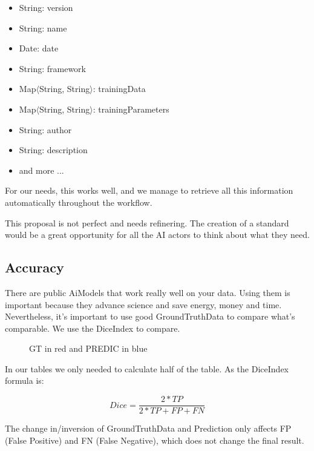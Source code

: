 \begin{itemize}
    \item String: version
    \item String: name
    \item Date: date
    \item String: framework
    \item Map$\langle$String, String$\rangle$: trainingData
    \item Map$\langle$String, String$\rangle$: trainingParameters
    \item String: author
    \item String: description
    \item and more ...
\end{itemize}

For our needs, this works well, and we manage to retrieve all this information
automatically throughout the workflow.

This proposal is not perfect and needs refinering. The creation of a standard
would be a great opportunity for all the \Gls{AI} actors to think about what they
need.

\subsection{Accuracy}

There are public \Gls{AiModel}s that work really well on your data. Using them is
important because they advance science and save energy, money and time.
Nevertheless, it's important to use good \Gls{GroundTruthData} to compare what's
comparable. We use the \Gls{DiceIndex} to compare.

\begin{figure}[H]
\centering
{}
\caption{GT in red and PREDIC in blue} \label{fig:dice}
\end{figure}

In our tables we only needed to calculate half of the table. As the
\Gls{DiceIndex} formula is:

\[ Dice = \frac{2*TP}{2*TP + FP + FN} \]

The change in/inversion of \Gls{GroundTruthData} and Prediction
only affects FP (False Positive) and FN (False Negative), which does not change
the final result.

